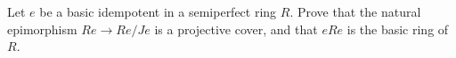 Let $e$ be a basic idempotent in a semiperfect ring $R$. Prove that the natural epimorphism $R e \to R e/J e$ is a projective cover, and that $e R e$ is the basic ring of $R$.
